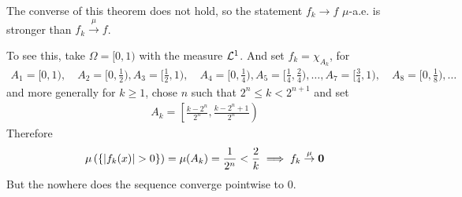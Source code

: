 \begin{rem}
The converse of this theorem does not hold, so the statement $f_k \to f$ $\mu$-a.e. is stronger than $f_k \stackrel{\mu}{\to} f$.

To see this, take $\Omega = [0,1)$ with the measure $\mathcal{L}^{1}$.
And set $f_k = \chi_{A_k}$, for
\begin{align*}
  A_1 = [0,1), \quad 
  A_2 = [0,\tfrac{1}{2}), A_3 = [\tfrac{1}{2},1), \quad 
  A_4 = [0,\tfrac{1}{4}), A_5 = [\tfrac{1}{4},\tfrac{2}{4}), \ldots, A_7 = [\tfrac{3}{4},1), \quad 
  A_8 = [0, \tfrac{1}{8}), \ldots
\end{align*}
and more generally for $k \geq 1$, chose $n$ such that $2^{n} \leq k < 2^{n+1}$ and set
\begin{align*}
  A_k = \left[\frac{k - 2^{n}}{2^{n}}, \frac{k- 2^{n}+1}{2^{n}}\right)
\end{align*}
Therefore
\begin{align*}
  \mu\left(
  \{\vert f_k(x)\vert > 0\}
\right) = \mu(A_k) = \frac{1}{2^{n}} < \frac{2}{k} \implies f_k \stackrel{\mu}{\to} \bm{0}
\end{align*}
But the nowhere does the sequence converge pointwise to $0$.
\end{rem}

